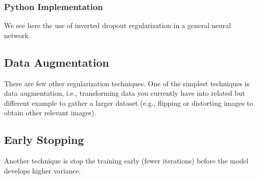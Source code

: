 \subsubsection{Python Implementation}
We see here the use of inverted dropout regularization in a general neural network.





\subsection{Data Augmentation}

There are few other regularization techniques.  One of the simplest techniques is data augmentation, i.e., transforming data you currently have into related but different example to gather a larger dataset (e.g., flipping or distorting images to obtain other relevant images).

\subsection{Early Stopping}
Another technique is stop the training early (fewer iterations) before the model develops higher variance.

